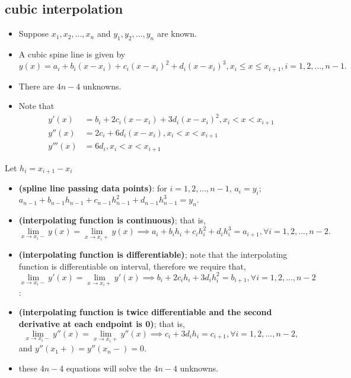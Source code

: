 \begin{refsection}
\subsection{cubic interpolation}\label{appendix:sec:cubicSplineLine}

\begin{definition}\cite{hagan2006interpolation}
\begin{itemize}
	\item Suppose $x_1,x_2,...,x_n$ and $y_1,y_2,...,y_n$ are known. 
	\item A cubic spine line is given by
	$$y(x) = a_i + b_i(x - x_i) + c_i(x-x_i)^2 + d_i(x-x_i)^3, x_i\leq x \leq x_{i+1}, i=1,2,...,n-1.$$
	\item There are $4n-4$ unknowns.
	\item Note that
\begin{align*}
y'(x) &= b_i + 2c_i(x-x_i) +　3d_i(x-x_i)^2, x_i < x < x_{i+1} \\
y''(x) &= 2c_i +　6d_i(x-x_i), x_i < x < x_{i+1} \\
y'''(x) &= 6d_i, x_i < x < x_{i+1} 
\end{align*}
\end{itemize}	
\end{definition}



\begin{definition}\cite{hagan2006interpolation}\hfill
Let $h_i = x_{i+1}-x_i$
\begin{itemize}
	\item \textbf{(spline line passing data points)}: for $i=1,2,...,n-1$, $a_i = y_i$; $a_{n-1} + b_{n-1}h_{n-1} + c_{n-1}h_{n-1}^2 + d_{n-1}h_{n-1}^3= y_n.$
	
	\item \textbf{(interpolating function is continuous)}; that is, $$\lim_{x\to x_i-} y(x) = \lim_{x\to x_i+} y(x)\implies a_i+b_ih_i + c_ih_i^2 + d_ih_i^3 = a_{i+1}, \forall i=1,2,...,n-2.$$
	
	\item \textbf{(interpolating function is differentiable)}; note that the interpolating function is differentiable on interval, therefore we require that, $$\lim_{x\to x_i-} y'(x) = \lim_{x\to x_i+} y'(x)\implies b_i + 2c_i h_i +  3d_ih_i^2 = b_{i+1}, \forall i=1,2,...,n-2$$:
	\item \textbf{(interpolating function is twice differentiable and the second derivative at each endpoint is 0)}; that is, $$\lim_{x\to x_i-} y''(x) = \lim_{x\to x_i+} y''(x) \implies c_i + 3d_ih_i = c_{i+1}, \forall i=1,2,...,n-2,$$ 
	and $y''(x_1+) = y''(x_n-) = 0.$
	\item these $4n-4$ equations will solve the $4n-4$ unknowns.
\end{itemize}
	

\end{definition}
\end{refsection}
